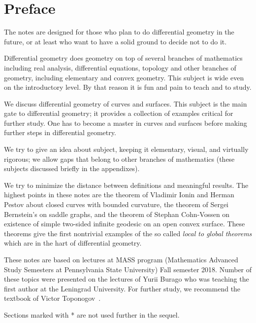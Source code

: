 
\chapter*{Preface}

The notes are designed for those who plan to do differential geometry in the future,
or at least who want to have a solid ground to decide not to do it.

Differential geometry does geometry on top of several branches of mathematics including real analysis, differential equations, topology and other branches of geometry, including elementary and convex geometry.
This subject is wide even on the introductory level. 
By that reason it is fun and pain to teach and to study.

We discuss differential geometry of curves and surfaces.
This subject is the main gate to differential geometry;
it provides a collection of examples critical for further study.
One has to become a master in curves and surfaces before making further steps in differential geometry.

We try to give an idea about subject, keeping it elementary, visual, and virtually rigorous; we allow gaps that belong to other branches of mathematics (these subjects discussed briefly in the appendixes).

We try to minimize the distance between definitions and meaningful results.
The highest points in these notes are
the theorem of Vladimir Ionin and Herman Pestov about closed curves with bounded curvature,
the theorem of Sergei Bernstein's on saddle graphs,
and the theorem of Stephan Cohn-Vossen on existence of simple two-sided infinite geodesic on an open convex surface.
These theorems give the first nontrivial examples of the so called \emph{local to global theorems} which are in the hart of differential geometry. 

These notes are based on lectures at MASS program (Mathematics Advanced Study Semesters at Pennsylvania State University) Fall semester 2018.
Number of these topics were presented on the lectures of Yurii Burago who was teaching the first author at the Leningrad University.
For further study, we recommend the textbook of Victor Toponogov~\cite{toponogov}.

Sections marked with * are not used further in the sequel.
